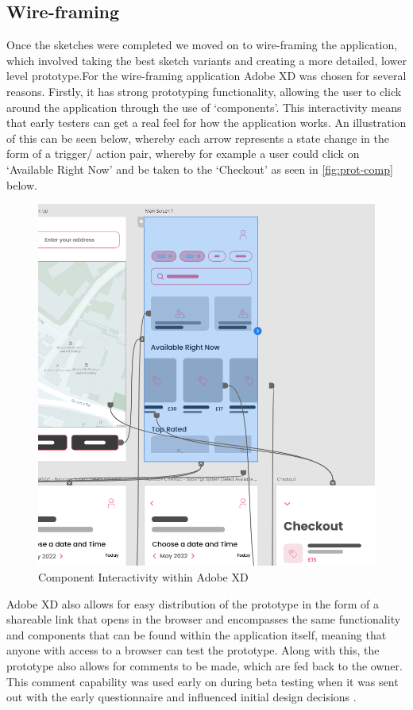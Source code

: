 \documentclass[12pt]{article}
\begin{document}
	\subsection{Wire-framing}
	Once the sketches were completed we moved on to wire-framing the application, which involved taking the best sketch variants and creating a more detailed, lower level prototype.For the wire-framing application Adobe XD was chosen for several reasons. Firstly, it has strong prototyping functionality, allowing the user to click around the application through the use of ‘components’. This interactivity means that early testers can get a real feel for how the application works. An illustration of this can be seen below, whereby each arrow represents a state change in the form of a trigger/ action pair, whereby for example a user could click on ‘Available Right Now’ and be taken to the ‘Checkout’ as seen in \autoref{fig:prot-comp} below.
	\begin{figure}[H]
		\centering
		\includegraphics[scale=0.5]{images/prototyping-components.png}
		\caption{Component Interactivity within Adobe XD}
		\label{fig:prot-comp}
	\end{figure}
	
	
	Adobe XD also allows for easy distribution of the prototype in the form of a shareable link that opens in the browser and encompasses the same functionality and components that can be found within the application itself, meaning that anyone with access to a browser can test the prototype. Along with this, the prototype also allows for comments to be made, which are fed back to the owner. This comment capability was used early on during beta testing when it was sent out with the early questionnaire and influenced initial design decisions \cite{SketchVsFigma0200}.
	
\end{document}
